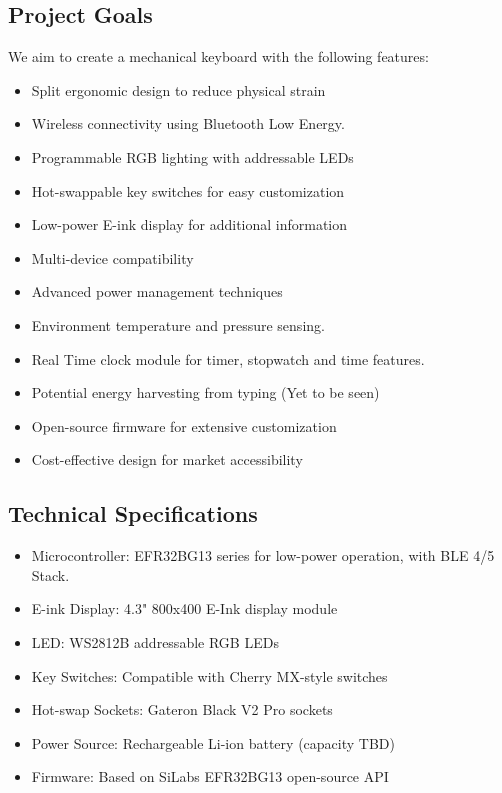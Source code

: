 \documentclass[a4paper,11pt]{article}%
\begin{document}
\subsection{Project Goals}
We aim to create a mechanical keyboard with the following features:
\begin{itemize}
    \item Split ergonomic design to reduce physical strain
    \item Wireless connectivity using Bluetooth Low Energy.
    \item Programmable RGB lighting with addressable LEDs
    \item Hot-swappable key switches for easy customization
    \item Low-power E-ink display for additional information
    \item Multi-device compatibility
    \item Advanced power management techniques
    \item Environment temperature and pressure sensing.
    \item Real Time clock module for timer, stopwatch and time features.
    \item Potential energy harvesting from typing (Yet to be seen)
    \item Open-source firmware for extensive customization
    \item Cost-effective design for market accessibility
\end{itemize}

\subsection{Technical Specifications}
\begin{itemize}
    \item Microcontroller: EFR32BG13 series for low-power operation, with BLE 4/5 Stack.
    \item E-ink Display: 4.3" 800x400 E-Ink display module
    \item LED: WS2812B addressable RGB LEDs
    \item Key Switches: Compatible with Cherry MX-style switches
    \item Hot-swap Sockets: Gateron Black V2 Pro sockets
    \item Power Source: Rechargeable Li-ion battery (capacity TBD)
    \item Firmware: Based on SiLabs EFR32BG13 open-source API
\end{itemize}
\end{document}
